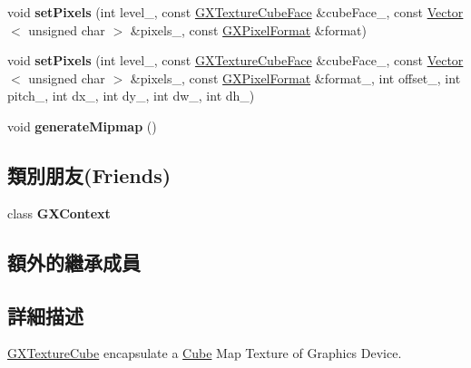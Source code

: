 \begin{DoxyCompactItemize}
\item 
void {\bfseries set\+Pixels} (int level\+\_\+, const \hyperlink{class_magnum_1_1_g_x_texture_cube_face}{G\+X\+Texture\+Cube\+Face} \&cube\+Face\+\_\+, const \hyperlink{class_magnum_1_1_vector}{Vector}$<$ unsigned char $>$ \&pixels\+\_\+, const \hyperlink{class_magnum_1_1_g_x_pixel_format}{G\+X\+Pixel\+Format} \&format)\hypertarget{class_magnum_1_1_g_x_texture_cube_a037f4db0dc54f3de154d63a68afcb14a}{}\label{class_magnum_1_1_g_x_texture_cube_a037f4db0dc54f3de154d63a68afcb14a}

\item 
void {\bfseries set\+Pixels} (int level\+\_\+, const \hyperlink{class_magnum_1_1_g_x_texture_cube_face}{G\+X\+Texture\+Cube\+Face} \&cube\+Face\+\_\+, const \hyperlink{class_magnum_1_1_vector}{Vector}$<$ unsigned char $>$ \&pixels\+\_\+, const \hyperlink{class_magnum_1_1_g_x_pixel_format}{G\+X\+Pixel\+Format} \&format\+\_\+, int offset\+\_\+, int pitch\+\_\+, int dx\+\_\+, int dy\+\_\+, int dw\+\_\+, int dh\+\_\+)\hypertarget{class_magnum_1_1_g_x_texture_cube_afba12ebcd067cd975742f901c56c9f9c}{}\label{class_magnum_1_1_g_x_texture_cube_afba12ebcd067cd975742f901c56c9f9c}

\item 
void {\bfseries generate\+Mipmap} ()\hypertarget{class_magnum_1_1_g_x_texture_cube_ae481abe8d13f382c57c6f3d0380e96de}{}\label{class_magnum_1_1_g_x_texture_cube_ae481abe8d13f382c57c6f3d0380e96de}

\end{DoxyCompactItemize}
\subsection*{類別朋友(Friends)}
\begin{DoxyCompactItemize}
\item 
class {\bfseries G\+X\+Context}\hypertarget{class_magnum_1_1_g_x_texture_cube_a2c36d7f8865080802bbad88cd73d871c}{}\label{class_magnum_1_1_g_x_texture_cube_a2c36d7f8865080802bbad88cd73d871c}

\end{DoxyCompactItemize}
\subsection*{額外的繼承成員}


\subsection{詳細描述}
\hyperlink{class_magnum_1_1_g_x_texture_cube}{G\+X\+Texture\+Cube} encapsulate a \hyperlink{class_magnum_1_1_cube}{Cube} Map Texture of Graphics Device. 

